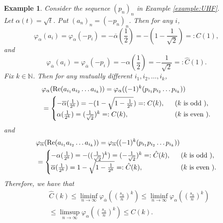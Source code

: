 \documentclass[a4paper,12pt]{amsart}
\newtheorem{example}[definition]{Example}
\newcommand{\N}{\mathbb{N}}
\begin{document}
\begin{example} \rm
Consider the sequence $(p_n)_n$ in Example \ref{example:UHF}. \\
Let $\alpha(t) ={\sqrt t}$.  Put $(a_n)_n = (-p_n)_n$.  Then for any $i$, 
$$
\varphi_{\alpha}(a_i) = \varphi_{\alpha}(-p_i) = - \overline{\alpha}(\frac{1}{2}) = - (1 - \frac{1}{\sqrt 2}) =: C(1), 
$$
and 
$$
\varphi_{\overline{\alpha}}(a_i) = \varphi_{\overline{\alpha}}(-p_i) = - \alpha(\frac{1}{2}) = - \frac{1}{\sqrt 2}
=:{\hat C}(1).
$$
Fix $k \in  \N$. Then 
for any mutually different $i_1, i_2, \dots, i_k$, 
\begin{align*}
& \varphi_{\alpha}({\rm Re} (a_{i_1}a_{i_2} \dots a_{i_k}) ) 
= \varphi_{\alpha}((-1)^k (p_{i_1}p_{i_2} \dots p_{i_k}) ) \\
& = \begin{cases}
- \overline{\alpha}(\frac{1}{2^k}) = - (1 - \sqrt{1-\frac{1}{2^k}}) =: C(k), \ \ &(k \text{ is odd }), \\
 \alpha(\frac{1}{2^k}) = (\frac{1}{\sqrt{2}})^k  =: C(k),  \ \ &(k \text{ is even }). 
\end{cases}
\end{align*}
and
\begin{align*}
& \varphi_{\overline{\alpha}}({\rm Re} (a_{i_1}a_{i_2} \dots a_{i_k}) ) 
= \varphi_{\overline{\alpha}}((-1)^k (p_{i_1}p_{i_2} \dots p_{i_k}) ) \\
& = \begin{cases}
- \alpha(\frac{1}{2^k}) = - ((\frac{1}{\sqrt{2}})^k ) = (- \frac{1}{\sqrt{2}})^k =: \hat{C}(k), \ \ &(k \text{ is odd }), \\
\overline{\alpha}(\frac{1}{2^k}) = 1 - \sqrt{1-\frac{1}{2^k}}  =:\hat{C}(k),  \ \ &(k \text{ is even }). 
\end{cases}
\end{align*}
Therefore, we have that
\begin{align*}
 &\hat{C}(k) \leq \liminf _{n \to \infty}  \varphi_{\overline{\alpha}}((\frac{s_n}{n})^k) 
\leq \liminf _{n \to \infty}  \varphi_{\alpha}((\frac{s_n}{n})^k) \\ 
&\leq  \limsup _{n \to \infty}  \varphi_{\alpha}((\frac{s_n}{n})^k) \leq C(k). 
\end{align*}
\end{example}
\end{document}
